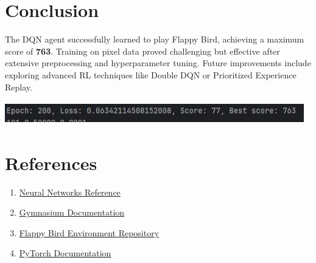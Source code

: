\documentclass[a4paper,12pt]{article}
\begin{document}
\section{Conclusion}
The DQN agent successfully learned to play Flappy Bird, achieving a maximum score of \textbf{763}. Training on pixel data proved challenging but effective after extensive preprocessing and hyperparameter tuning. Future improvements include exploring advanced RL techniques like Double DQN or Prioritized Experience Replay.
\hspace{5mm}
\begin{center}
    \includegraphics[width=13cm, height=1cm]{max-score.png}
    \end{center}

\section*{References}
\begin{enumerate}
    \item \href{https://sites.google.com/view/rbenchea/neural-networks}{Neural Networks Reference}
    \item \href{https://github.com/Farama-Foundation/Gymnasium}{Gymnasium Documentation}
    \item \href{https://github.com/Tavase/FlappyBirdGymnasium}{Flappy Bird Environment Repository}
    \item \href{https://pytorch.org/}{PyTorch Documentation}
\end{enumerate}
\end{document}
